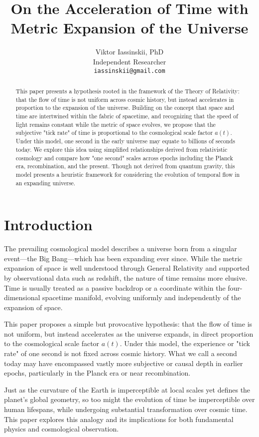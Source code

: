 \documentclass[12pt]{article}
\title{On the Acceleration of Time with Metric Expansion of the Universe}
\author{Viktor Iassinskii, PhD\\Independent Researcher\\\texttt{iassinskii@gmail.com}}
\date{}
\begin{document}
\maketitle

\begin{abstract}
This paper presents a hypothesis rooted in the framework of the Theory of Relativity: that the flow of time is not uniform across cosmic history, but instead accelerates in proportion to the expansion of the universe. Building on the concept that space and time are intertwined within the fabric of spacetime, and recognizing that the speed of light remains constant while the metric of space evolves, we propose that the subjective "tick rate" of time is proportional to the cosmological scale factor $a(t)$. Under this model, one second in the early universe may equate to billions of seconds today. We explore this idea using simplified relationships derived from relativistic cosmology and compare how "one second" scales across epochs including the Planck era, recombination, and the present. Though not derived from quantum gravity, this model presents a heuristic framework for considering the evolution of temporal flow in an expanding universe.
\end{abstract}

\section{Introduction}
The prevailing cosmological model describes a universe born from a singular event---the Big Bang---which has been expanding ever since. While the metric expansion of space is well understood through General Relativity and supported by observational data such as redshift, the nature of time remains more elusive. Time is usually treated as a passive backdrop or a coordinate within the four-dimensional spacetime manifold, evolving uniformly and independently of the expansion of space.

This paper proposes a simple but provocative hypothesis: that the flow of time is not uniform, but instead accelerates as the universe expands, in direct proportion to the cosmological scale factor $a(t)$. Under this model, the experience or "tick rate" of one second is not fixed across cosmic history. What we call a second today may have encompassed vastly more subjective or causal depth in earlier epochs, particularly in the Planck era or near recombination.

Just as the curvature of the Earth is imperceptible at local scales yet defines the planet's global geometry, so too might the evolution of time be imperceptible over human lifespans, while undergoing substantial transformation over cosmic time. This paper explores this analogy and its implications for both fundamental physics and cosmological observation.
\end{document}
